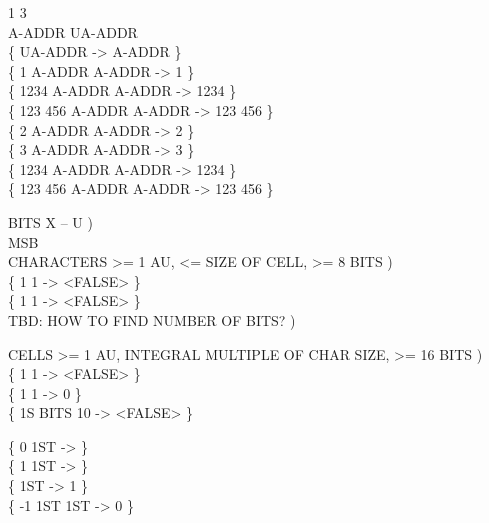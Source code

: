 \begin{tt}
  1      3   \\
 A-ADDR   UA-ADDR \\
\{ UA-ADDR  -> A-ADDR \} \\
\{       1 A-ADDR                 A-ADDR               ->       1 \} \\
\{    1234 A-ADDR \word{!}                 A-ADDR                ->    1234 \} \\
\{ 123 456 A-ADDR                 A-ADDR               -> 123 456 \} \\
\{       2 A-ADDR     A-ADDR   ->       2 \} \\
\{       3 A-ADDR     A-ADDR   ->       3 \} \\
\{    1234 A-ADDR  \word{!}    A-ADDR    ->    1234 \} \\
\{ 123 456 A-ADDR     A-ADDR   -> 123 456 \}

\word{:} BITS  X -- U ) \\
      MSB 
	       
\word{;} \\
 CHARACTERS >= 1 AU, <= SIZE OF CELL, >= 8 BITS ) \\
\{ 1  1  -> <FALSE> \} \\
\{ 1  1   -> <FALSE> \} \\
 TBD: HOW TO FIND NUMBER OF BITS? )

 CELLS >= 1 AU, INTEGRAL MULTIPLE OF CHAR SIZE, >= 16 BITS ) \\
\{ 1  1  -> <FALSE> \} \\
\{ 1  1   -> 0 \} \\
\{ 1S BITS 10  -> <FALSE> \}

\{  0 1ST \word{!}  -> \} \\
\{  1 1ST \word{+!} -> \} \\
\{    1ST   -> 1 \} \\
\{ -1 1ST \word{+!} 1ST  -> 0 \}
\end{tt}

